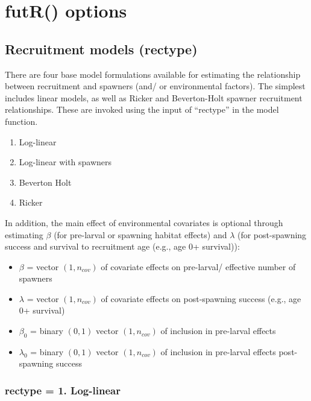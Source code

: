 \documentclass[
]{article}
\providecommand{\tightlist}{%
  \setlength{\itemsep}{0pt}\setlength{\parskip}{0pt}}
\begin{document}
\hypertarget{futr-options}{%
\section{futR() options}\label{futr-options}}

\hypertarget{recruitment-models-rectype}{%
\subsection{Recruitment models
(rectype)}\label{recruitment-models-rectype}}

There are four base model formulations available for estimating the
relationship between recruitment and spawners (and/ or environmental
factors). The simplest includes linear models, as well as Ricker and
Beverton-Holt spawner recruitment relationships. These are invoked using
the input of ``rectype'' in the model function.

\begin{enumerate}
\def\labelenumi{\arabic{enumi}.}
\tightlist
\item
  Log-linear
\item
  Log-linear with spawners
\item
  Beverton Holt
\item
  Ricker
\end{enumerate}

In addition, the main effect of environmental covariates is optional
through estimating \(\beta\) (for pre-larval or spawning habitat
effects) and \(\lambda\) (for post-spawning success and survival to
recruitment age (e.g., age 0+ survival)):

\begin{itemize}
\tightlist
\item
  \(\beta\) = vector \((1,n_{cov})\) of covariate effects on pre-larval/
  effective number of spawners
\item
  \(\lambda\) = vector \((1,n_{cov})\) of covariate effects on
  post-spawning success (e.g., age 0+ survival)
\item
  \(\beta_0\) = binary \((0,1)\) vector \((1,n_{cov})\) of inclusion in
  pre-larval effects
\item
  \(\lambda_0\) = binary \((0,1)\) vector \((1,n_{cov})\) of inclusion
  in pre-larval effects post-spawning success
\end{itemize}

\hypertarget{rectype-1.-log-linear}{%
\subsubsection{rectype = 1. Log-linear}\label{rectype-1.-log-linear}}
\end{document}
